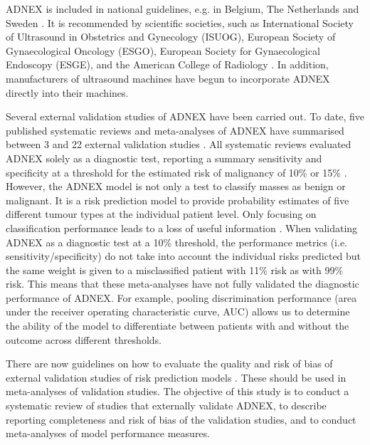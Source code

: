 \gls{ADNEX} is included in national guidelines, e.g. in Belgium, The Netherlands and
Sweden
 \cite{RegionalaCancercentrumSamverkan2023,
ignaceEierstokkankerDiagnoseBehandeling2016,geominipZonMwProjACCEPTAccuracy2021}.
It is recommended by scientific societies, such as International Society of
Ultrasound in Obstetrics and Gynecology (\gls{ISUOG}), European Society of
Gynaecological Oncology (\gls{ESGO}), European Society for Gynaecological Endoscopy
(\gls{ESGE}), and the American College of Radiology
 \cite{timmermanESGOISUOGIOTA2021,
andreottiORADSUSRisk2020}. In addition,
manufacturers of ultrasound machines have begun to incorporate \gls{ADNEX} directly
into their machines.

Several external validation studies of \gls{ADNEX} have been carried out. To date,
five published systematic reviews and meta-analyses of \gls{ADNEX} have summarised
between 3 and 22 external validation studies
 \cite{cuiDiagnosticAccuraciesUltrasound2022,
davenportMenopausalStatusUltrasound2022,
huangDiagnosticAccuracyADNEX2021,
westwoodRiskScoresGuide2018,
yueValueAssessmentDifferent2022}.
All systematic reviews evaluated \gls{ADNEX} solely as a diagnostic test, reporting a
summary sensitivity and specificity at a threshold for the estimated risk of
malignancy of 10\% or 15\%
 \cite{cuiDiagnosticAccuraciesUltrasound2022,
davenportMenopausalStatusUltrasound2022,
huangDiagnosticAccuracyADNEX2021,
westwoodRiskScoresGuide2018,
yueValueAssessmentDifferent2022}.
However, the \gls{ADNEX} model is not only a test to classify masses as benign or
malignant. It is a risk prediction model to provide probability estimates of
five different tumour types at the individual patient level. Only focusing on
classification performance leads to a loss of useful information
 \cite{onbehalfofthetopicgroupevaluatingdiagnostictestsandpredictionmodelsofthestratosinitiativeThreeMythsRisk2019}.
When validating \gls{ADNEX} as a diagnostic test at a 10\% threshold, the performance
metrics (i.e. sensitivity/specificity) do not take into account the individual
risks predicted but the same weight is given to a misclassified patient with
11\% risk as with 99\% risk. This means that these meta-analyses have not fully
validated the diagnostic performance of \gls{ADNEX}. For example, pooling
discrimination performance (area under the receiver operating characteristic
curve, \gls{AUC}) allows us to determine the ability of the model to differentiate
between patients with and without the outcome across different thresholds.

There are now guidelines on how to evaluate the quality and risk of bias of
external validation studies of risk prediction models
 \cite{debrayGuideSystematicReview2017,
wolffPROBASTToolAssess2019,
snellTransparentReportingMultivariable2023}.
These should be used in meta-analyses of validation studies. The objective of
this study is to conduct a systematic review of studies that externally validate
\gls{ADNEX}, to describe reporting completeness and risk of bias of the validation
studies, and to conduct meta-analyses of model performance measures.

